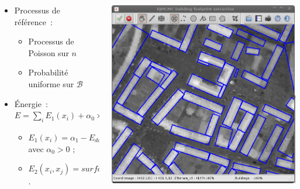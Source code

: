\documentclass{beamer}
\begin{document}
\begin{frame}
\begin{columns}
\begin{column}{0.55\textwidth}
\begin{itemize}
\item Processus de référence~:
\begin{itemize}
\item Processus de Poisson sur $n$
\item Probabilité uniforme sur $\mathcal{B}$
\end{itemize}
\item \'Energie~: $E = \sum_i E_1(x_i) + \alpha_{0} \times \sum_{i<j} E_2(x_i,x_j)$
\begin{itemize}
\item $E_1(x_i)=\alpha_{1} - E_{data}(x_i)$ avec $\alpha_{0}>0$ ;
\item $E_2(x_i,x_j) = surface(x_i \cap x_j)$.
\end{itemize}
\end{itemize}
\end{column}
\begin{column}{0.45\textwidth}
 \includegraphics[width=\textwidth]{configuration}
\end{column}
\end{columns}
\end{frame}
\end{document}
